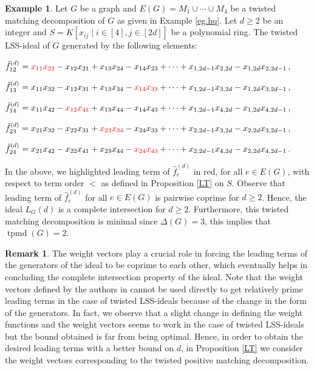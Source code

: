 \documentclass[11pt,a4paper,reqno]{amsart}
\theoremstyle{definition}
\newtheorem{remark}[thm]{Remark}
\newtheorem{eg}[thm]{Example}
\numberwithin{equation}{section}
\DeclareMathOperator{\tpmd}{tpmd}
\begin{document}
\begin{eg}
 Let $G$ be a graph and $E(G)=M_1 \cup \cdots \cup M_4$ be a twisted matching decomposition of $G$ as given in Example \ref{eg.hq}. Let $d \geq 2$ be an integer and $S=K[x_{ij} \mid i \in [4], j \in [2d]]$ be a polynomial ring. The twisted LSS-ideal of $G$ generated by the following elements:
    
    $\hat{f}_{12}^{(d)}= \textcolor{red}{x_{11}x_{22}}-x_{12}x_{21}+x_{13}x_{24}-x_{14}x_{23}+\cdots + x_{1,2d-1}x_{2,2d}-x_{1,2d}x_{2,2d-1}$,
    
    $\hat{f}_{13}^{(d)}= x_{11}x_{32}-x_{12}x_{31}+x_{13}x_{34}-\textcolor{red}{x_{14}x_{33}}+\cdots + x_{1,2d-1}x_{3,2d}-x_{1,2d}x_{3,2d-1}$,

    $\hat{f}_{14}^{(d)}= x_{11}x_{42}-\textcolor{red}{x_{12}x_{41}}+x_{13}x_{44}-x_{14}x_{43}+\cdots + x_{1,2d-1}x_{4,2d}-x_{1,2d}x_{4,2d-1}$,
    
    $\hat{f}_{23}^{(d)}= x_{21}x_{32}-x_{22}x_{31}+\textcolor{red}{x_{23}x_{34}}-x_{24}x_{33}+\cdots + x_{2,2d-1}x_{3,2d}-x_{2,2d}x_{3,2d-1}$,
    
    $\hat{f}_{24}^{(d)}= {x_{21}x_{42}}-x_{22}x_{41}+x_{23}x_{44}-\textcolor{red}{x_{24}x_{43}}+\cdots + x_{2,2d-1}x_{4,2d}-x_{2,2d}x_{4,2d-1}$.
    
    \vspace{2mm}

\noindent In the above, we highlighted leading term of $\hat{f}_{e}^{(d)}$ in red, for all $e\in E(G)$, with respect to term order $<$ as defined in Proposition \ref{LT} on $S$. Observe that leading term of $\hat{f}_{e}^{(d)}$ for all $e \in E(G)$ is pairwise coprime for $d \geq 2$. Hence, the ideal $L_G(d)$ is a complete intersection for $d \geq 2$. Furthermore, this twisted matching decomposition is minimal since $\Delta(G)=3$, this implies that $\tpmd(G) = 2$.
\end{eg}

\begin{remark}
The weight vectors play a crucial role in forcing the leading terms of the generators of the ideal to be coprime to each other, which eventually helps in concluding the complete intersection property of the ideal. 
Note that the weight vectors defined by the authors in \cite[Lemma $5.5$]{CW2019} cannot be used directly to get relatively prime leading terms 
in the case of twisted LSS-ideals because of the change in the form of the generators. In fact, we observe that a slight change in defining the weight functions and the weight vectors seems to work in the case of twisted LSS-ideals but the bound obtained is far from being optimal.
Hence, in order to obtain the desired leading terms with a better bound on $d$, in Proposition \ref{LT} we consider the weight vectors corresponding to the twisted positive matching decomposition. 
\end{remark}
\end{document}
